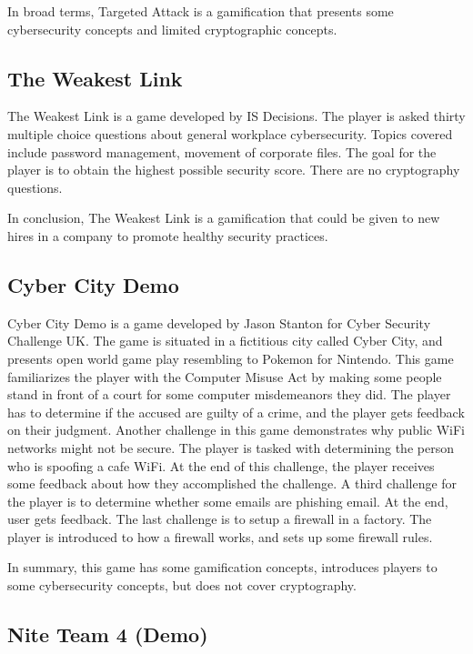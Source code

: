 \documentclass{l4proj}
\begin{document}
In broad terms, Targeted Attack is a gamification that presents some cybersecurity concepts and limited cryptographic concepts.

\subsection{The Weakest Link}

The Weakest Link is a game developed by IS Decisions. The player is asked thirty multiple choice questions about general workplace cybersecurity.
Topics covered include password management, movement of corporate files. The goal for the player is to obtain the highest possible security score.
There are no cryptography questions.

In conclusion, The Weakest Link is a gamification that could be given to new hires in a company to promote healthy security practices.

\subsection{Cyber City Demo}

Cyber City Demo is a game developed by Jason Stanton for Cyber Security Challenge UK.
The game is situated in a fictitious city called Cyber City, and presents open world game play resembling to Pokemon for Nintendo.
This game familiarizes the player with the Computer Misuse Act by making some people stand in front of a court for some computer misdemeanors they did.
The player has to determine if the accused are guilty of a crime, and the player gets feedback on their judgment.
Another challenge in this game demonstrates why public WiFi networks might not be secure. The player is tasked with determining the person who is spoofing a cafe WiFi.
At the end of this challenge, the player receives some feedback about how they accomplished the challenge.
A third challenge for the player is to determine whether some emails are phishing email. At the end, user gets feedback.
The last challenge is to setup a firewall in a factory. The player is introduced to how a firewall works, and sets up some firewall rules.

In summary, this game has some gamification concepts, introduces players to some cybersecurity concepts, but does not cover cryptography.

\subsection{Nite Team 4 (Demo)}
\end{document}
